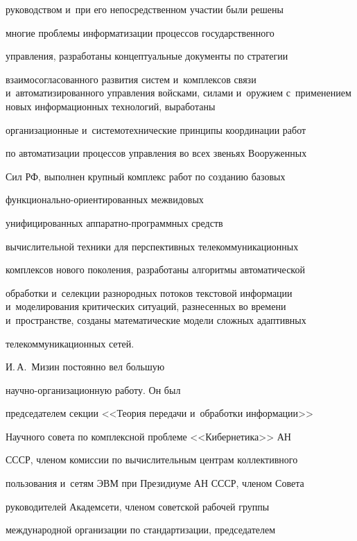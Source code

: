 руководством и~при его непосредственном участии были решены


многие проблемы информатизации процессов государственного


управления, разработаны концептуальные документы по стратегии


взаимосогласованного развития систем и~комплексов связи и~автоматизированного управления войсками, силами и~оружием с~применением новых информационных технологий, выработаны


организационные и~системотехнические принципы координации работ


по автоматизации процессов управления во всех звеньях Вооруженных


Сил РФ, выполнен крупный комплекс работ по созданию базовых


функ\-ци\-о\-наль\-но-ори\-ен\-ти\-ро\-ван\-ных межвидовых


унифицированных ап\-па\-рат\-но-про\-грам\-мных средств


вычислительной техники для перспективных телекоммуникационных


комплексов нового поколения, разработаны алгоритмы автоматической


обработки и~селекции разнородных потоков текстовой информации и~моделирования критических ситуаций, разнесенных во времени и~пространстве, созданы математические модели сложных адаптивных


телекоммуникационных сетей.


{





}





     И.\,А.~Мизин постоянно вел большую


     на\-уч\-но-ор\-га\-ни\-за\-ци\-он\-ную работу. Он был


председателем секции <<Теория передачи и~обработки информации>>


Научного совета по комплексной проблеме <<Кибернетика>> АН


СССР, членом комиссии по вычислительным центрам коллективного


пользования и~сетям ЭВМ при Президиуме АН СССР, членом Совета


руководителей Академсети, членом советской рабочей группы


международной организации по стандартизации, председателем


